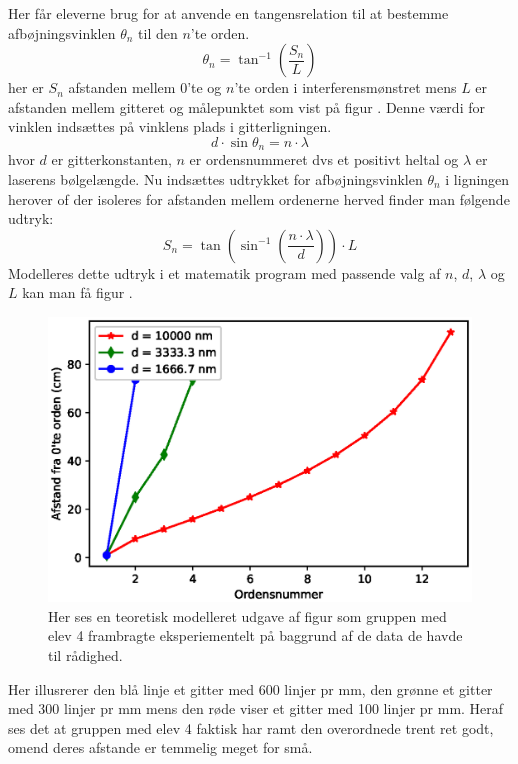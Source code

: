 Her får eleverne brug for at anvende en tangensrelation til at bestemme afbøjningsvinklen $\theta_n$ til den $n$'te orden. 
\begin{equation}
	\theta_n = \tan^{-1}\left(\frac{S_n}{L}\right)
\end{equation}
her er $S_n$ afstanden mellem 0'te og $n$'te orden i interferensmønstret mens $L$ er afstanden mellem gitteret og målepunktet som vist på figur . Denne værdi for vinklen indsættes på vinklens plads i gitterligningen.
\begin{equation}
	d\cdot\sin\theta_n = n\cdot \lambda
\end{equation}
hvor $d$ er gitterkonstanten, $n$ er ordensnummeret dvs et positivt heltal og $\lambda$ er laserens bølgelængde. Nu indsættes udtrykket for afbøjningsvinklen $\theta_n$ i ligningen herover of der isoleres for afstanden mellem ordenerne herved finder man følgende udtryk:
\begin{equation}
	S_n = \tan\left(\sin^{-1}\left(\frac{n\cdot\lambda}{d}\right)\right)\cdot L
\end{equation}
Modelleres dette udtryk i et matematik program med passende valg af $n$, $d$, $\lambda$ og $L$ kan man få figur . 
\begin{figure}[h!]
	\centering
	\includegraphics[width=\textwidth]{Figs/test}
	\caption{Her ses en teoretisk modelleret udgave af figur  som gruppen med elev 4 frambragte eksperiementelt på baggrund af de data de havde til rådighed.}
	\label{fig:eviden.app}
\end{figure}

Her illusrerer den blå linje et gitter med 600 linjer pr mm, den grønne et gitter med 300 linjer pr mm mens den røde viser et gitter med 100 linjer pr mm. Heraf ses det at gruppen med elev 4 faktisk har ramt den overordnede trent ret godt, omend deres afstande er temmelig meget for små.